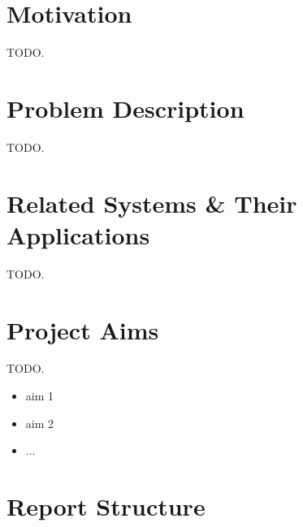 \section{Motivation}

TODO.\\


\section{Problem Description}
\label{sec:problem-description}

TODO.\\


\section{Related Systems \& Their Applications}
\label{sec:v2v_applications}

TODO.\\


\section{Project Aims}
\label{sec:introduction-project-aims}

TODO.\\

\begin{itemize}
    \item aim 1
    \item aim 2
    \item ...
\end{itemize}


\section{Report Structure}

